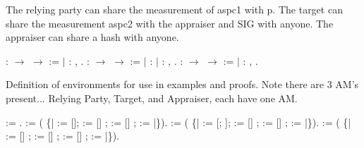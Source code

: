 \documentclass[12pt]{report}
\begin{document}
   The relying party can share the measurement of aspc1 with p. 
   The target can share the measurement aspc2 with the appraiser and SIG with anyone. 
   The appraiser can share a hash with anyone. 

\begin{coqdoccode}
\coqdocemptyline
\coqdocnoindent
{}  :  \ensuremath{\rightarrow}  \ensuremath{\rightarrow}  := \coqdoceol
\coqdocnoindent
\ensuremath{|}  : \coqdockw{\ensuremath{\forall}} ,   .\coqdoceol
\coqdocemptyline
\coqdocnoindent
{}  :  \ensuremath{\rightarrow}  \ensuremath{\rightarrow}  := \coqdoceol
\coqdocnoindent
\ensuremath{|}  :    \coqdoceol
\coqdocnoindent
\ensuremath{|}  : \coqdockw{\ensuremath{\forall}} ,   .\coqdoceol
\coqdocemptyline
\coqdocnoindent
{}  :  \ensuremath{\rightarrow}  \ensuremath{\rightarrow}  := \coqdoceol
\coqdocnoindent
\ensuremath{|}  : \coqdockw{\ensuremath{\forall}} ,   .\coqdoceol
\coqdocemptyline
\end{coqdoccode}
Definition of environments for use in examples and proofs.  
  Note there are 3 AM's present... 
    Relying Party, Target, and Appraiser, each have one AM. 
\begin{coqdoccode}
\coqdocemptyline
\coqdocnoindent
{}  := .\coqdoceol
\coqdocnoindent
{}  :=\coqdoceol
\coqdocindent{2.00em}
   ( \{|  := []; := [] ;  := [] ;  :=  |\}).\coqdoceol
\coqdocnoindent
{}  :=\coqdoceol
\coqdocindent{2.00em}
   ( \{|  := [;  ]; := [] ;  := [] ;  := |\}).\coqdoceol
\coqdocnoindent
{}  :=\coqdoceol
\coqdocindent{2.00em}
   ( \{|  := [] ; := [] ;  := [] ;  :=  |\}).\coqdoceol
\coqdocemptyline
\end{coqdoccode}
\end{document}
